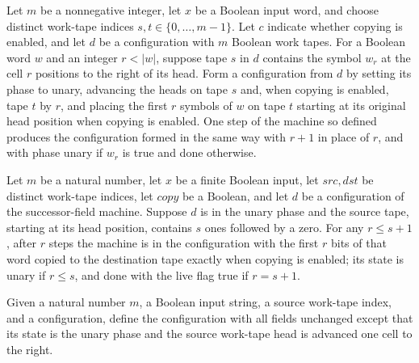\begin{lemma}
\label{Turing.StepBlock.succFieldTM_unary_step}
\leanok
{}
Let $m$ be a nonnegative integer, let $x$ be a Boolean input word, and choose distinct
work-tape indices $s,t\in\{0,\ldots,m-1\}$. Let $c$ indicate whether copying is enabled,
and let $d$ be a configuration with $m$ Boolean work tapes. For a Boolean word $w$ and
an integer $r<|w|$, suppose tape $s$ in $d$ contains the symbol $w_r$ at the cell $r$
positions to the right of its head. Form a configuration from $d$ by setting its phase
to unary, advancing the heads on tape $s$ and, when copying is enabled, tape $t$ by $r$,
and placing the first $r$ symbols of $w$ on tape $t$ starting at its original head
position when copying is enabled. One step of the machine so defined produces the
configuration formed in the same way with $r+1$ in place of $r$, and with phase unary if
$w_r$ is true and done otherwise.
\end{lemma}

\begin{lemma}
\label{Turing.StepBlock.succFieldTM_unary_run}
\leanok
{}
Let $m$ be a natural number, let $x$ be a finite Boolean input, let $src,dst$ be
distinct work-tape indices, let $copy$ be a Boolean, and let $d$ be a configuration of
the successor-field machine. Suppose $d$ is in the unary phase and the source tape,
starting at its head position, contains $s$ ones followed by a zero. For any $r\le s+1$,
after $r$ steps the machine is in the configuration with the first $r$ bits of that word
copied to the destination tape exactly when copying is enabled; its state is unary if
$r\le s$, and done with the live flag true if $r=s+1$.
\end{lemma}

\begin{definition}
\label{Turing.StepBlock.afterTag}
\leanok
{}
Given a natural number $m$, a Boolean input string, a source work-tape index, and a
configuration, define the configuration with all fields unchanged except that its state
is the unary phase and the source work-tape head is advanced one cell to the right.
\end{definition}

